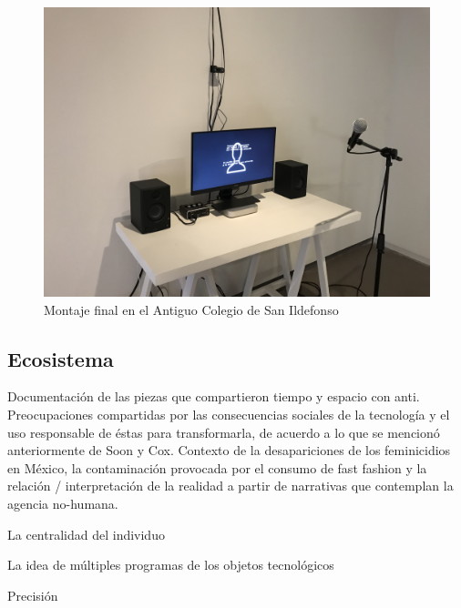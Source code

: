 \begin{figure}[tb]
\centering 
\includegraphics[width=\columnwidth]{../../img/ildefonso.jpg} 
\caption[Montaje Anti en San Ildefonso]{Montaje final en el Antiguo Colegio de San Ildefonso} %
\label{fig:gallery} 
\end{figure}


\subsection{Ecosistema}

Documentación de las piezas que compartieron tiempo y espacio con anti. Preocupaciones compartidas por las consecuencias sociales de la tecnología y el uso responsable de éstas para transformarla, de acuerdo a lo que se mencionó anteriormente de Soon y Cox. Contexto de la desapariciones de los feminicidios en México, la contaminación provocada por el consumo de fast fashion y la relación / interpretación de la realidad a partir de narrativas que contemplan la agencia no-humana. 

La centralidad del individuo 

La idea de múltiples programas de los objetos tecnológicos \citep{latour}


Precisión 

